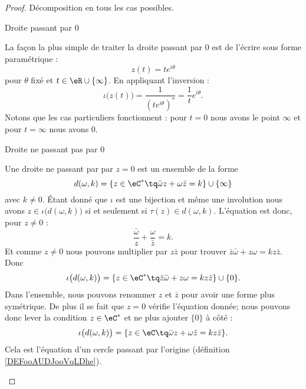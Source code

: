 \begin{proof}
    
    Décomposition en tous les cas possibles.
    \begin{subproof}
        \item[Droite passant par \( 0\)]

            La façon la plus simple de traiter la droite passant par \( 0\) est de l'écrire sous forme paramétrique :
            \begin{equation}
                z(t)=t e^{i\theta}
            \end{equation}
            pour \( \theta\) fixé et \( t\in \eR\cup\{ \infty \}\). En appliquant l'inversion :
            \begin{equation}
                \iota\big( z(t) \big)=\frac{1}{ (t e^{i\theta})^* }=\frac{1}{ t } e^{i\theta}.
            \end{equation}
            Notons que les cas particuliers fonctionnent : pour \( t=0\) nous avons le point \( \infty\) et pour \( t=\infty\) nous avons \( 0\).

        \item[Droite ne passant pas par \( 0\)]

            Une droite ne passant par par \( z=0\) est un ensemble de la forme
            \begin{equation}
                d(\omega,k)=\{ z\in \eC^*\tq \bar\omega z+\omega\bar z=k \}\cup \{ \infty \}
            \end{equation}
            avec \( k\neq 0\). Étant donné que \( \iota\) est une bijection et même une involution nous avons \( z\in\iota\big( d(\omega,k) \big)\) si et seulement si \( \tau(z)\in d(\omega,k)\). L'équation est donc, pour \( z\neq 0\) :
            \begin{equation}
                \frac{ \bar\omega }{ z }+\frac{ \omega }{ \bar z }=k.
            \end{equation}
            Et comme \( z\neq 0\) nous pouvons multiplier par \( z\bar z\) pour trouver \( \bar z\bar \omega+z\omega=kz\bar z\). Donc
            \begin{equation}
                \iota\big( d(\omega,k) \big)=\{ z\in \eC^*\tq  \bar z\bar \omega+z\omega=kz\bar z\}\cup\{ 0 \}.
            \end{equation}
            Dans l'ensemble, nous pouvons renommer \( z\) et \( \bar z\) pour avoir une forme plus symétrique. De plus il se fait que \( z=0\) vérifie l'équation donnée; nous pouvons donc lever la condition \( z\in \eC^*\) et ne plus ajouter \( \{ 0 \}\) à côté :
            \begin{equation}
                \iota\big( d(\omega,k) \big)=\{ z\in \eC\tq  \bar \omega z+\omega\bar z=kz\bar z\}.
            \end{equation}
            Cela est l'équation d'un cercle passant par l'origine (définition \ref{DEFooAUDJooVqLDhe}).
            

\end{subproof}
\end{proof}
